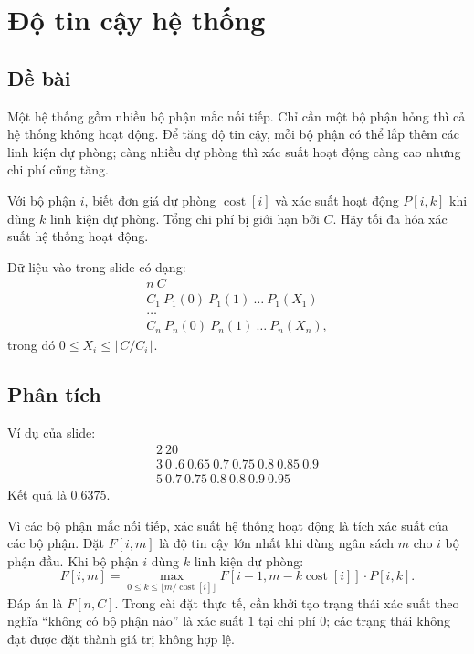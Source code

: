 \documentclass[11pt]{article}
\begin{document}
\section{Độ tin cậy hệ thống}

\subsection{Đề bài}

Một hệ thống gồm nhiều bộ phận mắc nối tiếp. Chỉ cần một bộ phận hỏng thì cả
hệ thống không hoạt động. Để tăng độ tin cậy, mỗi bộ phận có thể lắp thêm các
linh kiện dự phòng; càng nhiều dự phòng thì xác suất hoạt động càng cao nhưng
chi phí cũng tăng.

Với bộ phận \(i\), biết đơn giá dự phòng \(\operatorname{cost}[i]\) và xác
suất hoạt động \(P[i,k]\) khi dùng \(k\) linh kiện dự phòng. Tổng chi phí bị
giới hạn bởi \(C\). Hãy tối đa hóa xác suất hệ thống hoạt động.

Dữ liệu vào trong slide có dạng:
\[
\begin{array}{l}
n\ C\\
C_1\ P_1(0)\ P_1(1)\ \ldots\ P_1(X_1)\\
\ldots\\
C_n\ P_n(0)\ P_n(1)\ \ldots\ P_n(X_n),
\end{array}
\]
trong đó \(0\le X_i\le \lfloor C/C_i\rfloor\).

\subsection{Phân tích}

Ví dụ của slide:
\[
\begin{array}{l}
2\ 20\\
3\ 0\ .6\ 0.65\ 0.7\ 0.75\ 0.8\ 0.85\ 0.9\\
5\ 0.7\ 0.75\ 0.8\ 0.8\ 0.9\ 0.95
\end{array}
\]
Kết quả là \(0.6375\).

Vì các bộ phận mắc nối tiếp, xác suất hệ thống hoạt động là tích xác suất của
các bộ phận. Đặt \(F[i,m]\) là độ tin cậy lớn nhất khi dùng ngân sách \(m\)
cho \(i\) bộ phận đầu. Khi bộ phận \(i\) dùng \(k\) linh kiện dự phòng:
\[
  F[i,m]=
  \max_{0\le k\le \lfloor m/\operatorname{cost}[i]\rfloor}
  F[i-1,m-k\operatorname{cost}[i]]\cdot P[i,k].
\]
Đáp án là \(F[n,C]\). Trong cài đặt thực tế, cần khởi tạo trạng thái xác suất
theo nghĩa ``không có bộ phận nào'' là xác suất \(1\) tại chi phí \(0\); các
trạng thái không đạt được đặt thành giá trị không hợp lệ.
\end{document}
